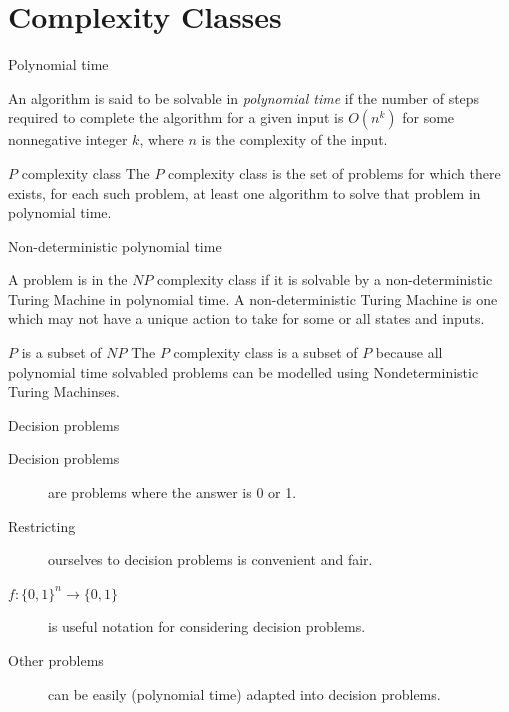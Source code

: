 \section{Complexity Classes}

\begin{frame}{Polynomial time}
  \begin{definition}
  An algorithm is said to be solvable in \emph{polynomial time} if the number of steps required to complete the algorithm for a given input is $O(n^k)$ for some nonnegative integer $k$, where $n$ is the complexity of the input.
  \end{definition}
  
  \vspace{0.5cm}
  \begin{block}{$P$ complexity class}
  The $P$ complexity class is the set of problems for which there exists, for each such problem, at least one algorithm to solve that problem in polynomial time.
  \end{block}

\end{frame}

\begin{frame}{Non-deterministic polynomial time}
  \begin{definition}
  A problem is in the $NP$ complexity class if it is solvable by a non-deterministic Turing Machine in polynomial time. A non-deterministic Turing Machine is one which may not have a unique action to take for some or all states and inputs.
  \end{definition}
  
  \vspace{0.5cm}
  \begin{block}{$P$ is a subset of $NP$}
  The $P$ complexity class is a subset of $P$ because all polynomial time solvabled problems can be modelled using Nondeterministic Turing Machinses.
  \end{block}

\end{frame}

\begin{frame}{Decision problems}
  \begin{description}
    \item[Decision problems] are problems where the answer is 0 or 1.
    \vspace{0.5cm}
    \item[Restricting] ourselves to decision problems is convenient and fair.
    \vspace{0.5cm}
    \item[$f:\{0,1\}^n \rightarrow \{0,1\}$] is useful notation for considering decision problems.
    \vspace{0.5cm}
    \item[Other problems] can be easily (polynomial time) adapted into decision problems.
  \end{description}
\end{frame}

